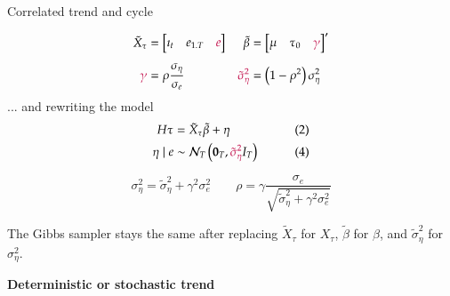 \documentclass[notes,blackandwhite,mathsans,usenames,dvipsnames]{beamer}
\begin{document}
\begin{frame}{Correlated trend and cycle}

\normalsize{} \small
\begin{align*}
\tilde{X}_\tau &= \begin{bmatrix}\imath_t&e_{1.T}&{\color{purple}e}\end{bmatrix} &\tilde\beta &= \begin{bmatrix}\mu & \tau_0 &{\color{purple}\gamma}\end{bmatrix}'\\[1ex]
{\color{purple}\gamma} &= \rho\frac{\sigma_\eta}{\sigma_e} &{\color{purple}\tilde\sigma_\eta^2} &= \left(1-\rho^2\right)\sigma_\eta^2 
\end{align*}\normalsize
{\color{mcxs2}... and rewriting the model}\small
\begin{align*}
H\tau &=  \tilde{X}_\tau \tilde\beta + \eta &&\tag{2}\\
\eta \mid e &\sim \mathcal{N}_{T}\left(\mathbf{0}_{T}, {\color{purple}\tilde\sigma_\eta^2}  I_T\right)&&\tag{4}
\end{align*}

\normalsize {} \small
$$ \sigma_\eta^2 = \tilde\sigma_\eta^2 + \gamma^2\sigma_e^2 \qquad
\rho = \gamma\frac{\sigma_e}{\sqrt{\tilde\sigma_\eta^2 + \gamma^2\sigma_e^2}}$$

\normalsize {\color{mcxs2}The Gibbs sampler stays the same after replacing} $\tilde{X}_\tau$ {\color{mcxs2}for} $X_\tau$, $\tilde\beta$ {\color{mcxs2}for} $\beta${\color{mcxs2}, and} $\tilde\sigma_\eta^2$ {\color{mcxs2}for} $\sigma_\eta^2$.
\end{frame}










{
\begin{frame}

\begin{adjustwidth}{-0.5cm}{0cm}
\vspace{8.3cm}
\Large\textbf{{\color{mcxs2}Deterministic or} {\color{mcxs3} stochastic trend}}
\end{adjustwidth}

\end{frame}
}
\end{document}

